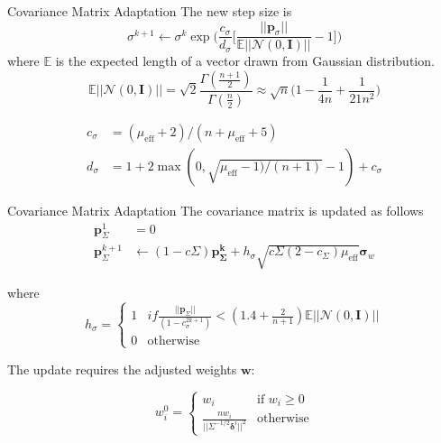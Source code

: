 \documentclass{beamer}
\begin{document}
\begin{frame}{Covariance Matrix Adaptation}
The new step size is 
\begin{equation*}
    \sigma^{k+1} \leftarrow \sigma^k \exp\bigg(\frac{c_\sigma}{d_\sigma} \bigg[\frac{||\boldsymbol{p}_\sigma
    ||}{\mathbb{E}||\mathcal{N}(0, \boldsymbol{I})||}-1\bigg]\bigg)
\end{equation*}
where $\mathbb{E}$ is the expected length of a vector drawn from Gaussian distribution.
\begin{equation*}
    \mathbb{E}||\mathcal{N}(0, \boldsymbol{I})|| = \sqrt{2} \frac{\Gamma(\frac{n+1}{2})}{\Gamma(\frac{n}{2})}
    \approx \sqrt{n}\bigg(1-\frac{1}{4n}+\frac{1}{21n^2}\bigg)
\end{equation*}

\begin{equation*}
    \begin{split}
    c_\sigma &= (\mu_{\textrm{eff}}+2)/(n+\mu_{\textrm{eff}}+5)\\
    d_\sigma &= 1 + 2\max (0, \sqrt{\mu_{\textrm{eff}}-1)/(n+1)} -1 ) + c_\sigma         
    \end{split}
\end{equation*}

\end{frame}

\begin{frame}{Covariance Matrix Adaptation}
The covariance matrix is updated as follows
\begin{equation*}
    \begin{split}
    \boldsymbol{p}_\Sigma^1 &= 0\\
    \boldsymbol{p}_\Sigma^{k+1} &\leftarrow (1-c\Sigma)\boldsymbol{p_\Sigma^k} + h_\sigma \sqrt{c\Sigma (2-c_\Sigma) \mu_{\textrm{eff}}}\boldsymbol{\sigma}_w
    \end{split}
\end{equation*}

where 
\begin{equation*}
    h_\sigma =
    \begin{cases}
    1& if \frac{||\boldsymbol{p}_\Sigma||}{(1-c_\sigma^{2k+1})} < (1.4 + \frac{2}{n+1})  \mathbb{E}||\mathcal{N}(0, \boldsymbol{I})||\\
    0& \textrm{otherwise}
    \end{cases}
\end{equation*}

The update requires the adjusted weights $\boldsymbol{w}$:

\begin{equation*}
    w_i^0 =
    \begin{cases}
    w_i& \textrm{if~} w_i \geq 0 \\
    \frac{nw_i}{||\Sigma^{-1/2}\boldsymbol{\delta}^i||^2}& \textrm{otherwise}
    \end{cases}
\end{equation*}

\end{frame}
\end{document}
